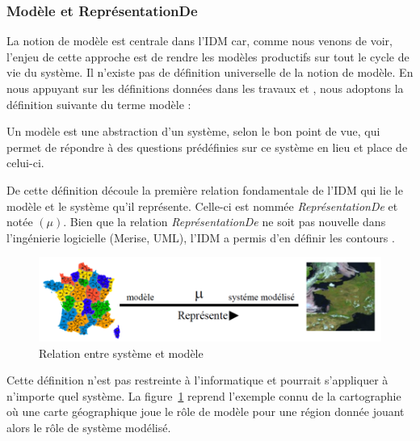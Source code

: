 \subsubsection{Modèle et ReprésentationDe}
La notion de modèle est centrale dans l'IDM car, comme nous venons de voir, 
l'enjeu de cette approche est de rendre les modèles productifs sur tout le cycle 
de vie du système. Il n'existe pas de définition universelle de la notion de 
modèle. En nous appuyant sur les définitions données dans les travaux 
\cite{minsky1967computation} \cite{bezivin2001towards} et 
\cite{seidewitz2003models}, nous adoptons la définition suivante du terme modèle 
:

\begin{definition}
Un modèle est une abstraction d'un système, selon le bon point de vue, qui 
permet de répondre à des questions prédéfinies sur ce système en lieu et place 
de celui-ci.
\end{definition}

De cette définition découle la première relation fondamentale de l'IDM qui lie 
le modèle et le système qu'il représente. Celle-ci est nommée 
\textit{ReprésentationDe} et notée $(\mu)$. Bien que la relation 
\textit{ReprésentationDe} ne soit pas nouvelle dans l'ingénierie logicielle 
(Merise, UML), l'IDM a permis d'en définir les contours \cite{atkinson2003model} 
\cite{seidewitz2003models} \cite{bezivin2004search}.

\begin{figure}[!htbp]
 \begin{center}
  \includegraphics[width=1\textwidth]{images/Chapitre1/favresystememodele.png}
 \end{center}
 \caption{Relation entre système et modèle \protect\cite{favre2006ingenierie}}
 \label{fig:systemModele}
\end{figure}

Cette définition n'est pas restreinte à l'informatique et pourrait s'appliquer à 
n'importe quel système. 
La figure~\ref{fig:systemModele} reprend l'exemple connu de la cartographie où 
une carte géographique joue le rôle de modèle pour une région donnée jouant 
alors le rôle de système modélisé. 

